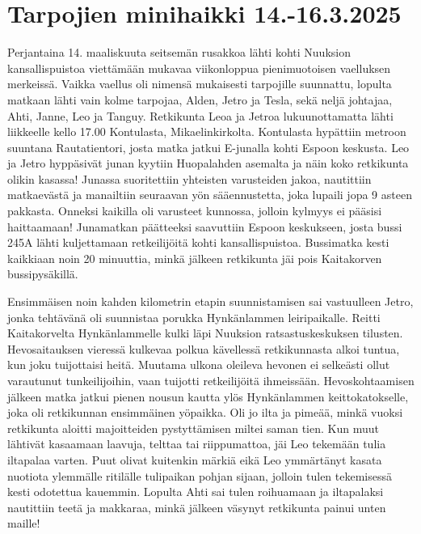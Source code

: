\section{Tarpojien minihaikki 14.-16.3.2025}

\begin{multicols}{2}

Perjantaina 14. maaliskuuta seitsemän rusakkoa lähti kohti Nuuksion kansallispuistoa viettämään mukavaa viikonloppua pienimuotoisen vaelluksen merkeissä. Vaikka vaellus oli nimensä mukaisesti tarpojille suunnattu, lopulta matkaan lähti vain kolme tarpojaa, Alden, Jetro ja Tesla, sekä neljä johtajaa, Ahti, Janne, Leo ja Tanguy. Retkikunta Leoa ja Jetroa lukuunottamatta lähti liikkeelle kello 17.00 Kontulasta, Mikaelinkirkolta. Kontulasta hypättiin metroon suuntana Rautatientori, josta matka jatkui E-junalla kohti Espoon keskusta. Leo ja Jetro hyppäsivät junan kyytiin Huopalahden asemalta ja näin koko retkikunta olikin kasassa! Junassa suoritettiin yhteisten varusteiden jakoa, nautittiin matkaevästä ja manailtiin seuraavan yön sääennustetta, joka lupaili jopa 9 asteen pakkasta. Onneksi kaikilla oli varusteet kunnossa, jolloin kylmyys ei pääsisi haittaamaan! Junamatkan päätteeksi saavuttiin Espoon keskukseen, josta bussi 245A lähti kuljettamaan retkeilijöitä kohti kansallispuistoa. Bussimatka kesti kaikkiaan noin 20 minuuttia, minkä jälkeen retkikunta jäi pois Kaitakorven bussipysäkillä. 

Ensimmäisen noin kahden kilometrin etapin suunnistamisen sai vastuulleen Jetro, jonka tehtävänä oli suunnistaa porukka Hynkänlammen leiripaikalle. Reitti Kaitakorvelta Hynkänlammelle kulki läpi Nuuksion ratsastuskeskuksen tilusten. Hevosaitauksen vieressä kulkevaa polkua kävellessä retkikunnasta alkoi tuntua, kun joku tuijottaisi heitä. Muutama ulkona oleileva hevonen ei selkeästi ollut varautunut tunkeilijoihin, vaan tuijotti retkeilijöitä ihmeissään. Hevoskohtaamisen jälkeen matka jatkui pienen nousun kautta ylös Hynkänlammen keittokatokselle, joka oli retkikunnan ensimmäinen yöpaikka. Oli jo ilta ja pimeää, minkä vuoksi retkikunta aloitti majoitteiden pystyttämisen miltei saman tien. Kun muut lähtivät kasaamaan laavuja, telttaa tai riippumattoa, jäi Leo tekemään tulia iltapalaa varten. Puut olivat kuitenkin märkiä eikä Leo ymmärtänyt kasata nuotiota ylemmälle ritilälle tulipaikan pohjan sijaan, jolloin tulen tekemisessä kesti odotettua kauemmin. Lopulta Ahti sai tulen roihuamaan ja iltapalaksi nautittiin teetä ja makkaraa, minkä jälkeen väsynyt retkikunta painui unten maille!


\end{multicols}
